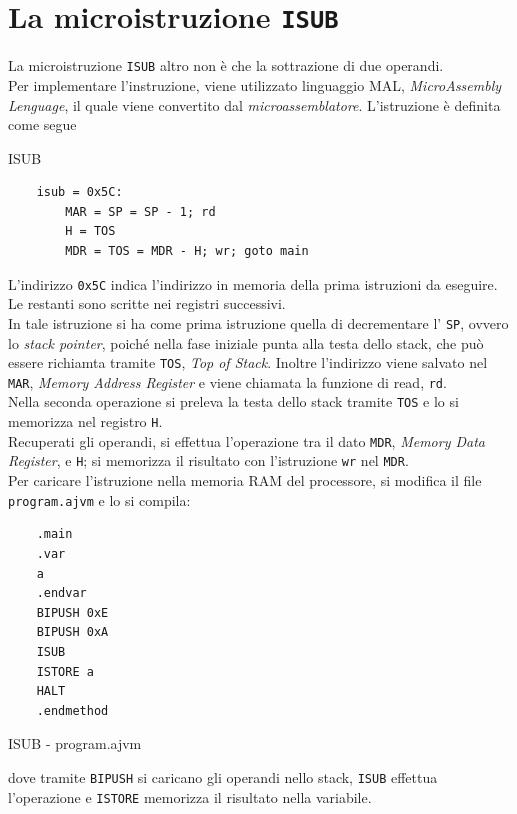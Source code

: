 \section{La microistruzione \texttt{ISUB}}
La microistruzione \texttt{ISUB} altro non è che la sottrazione di due operandi.\\
Per implementare l'instruzione, viene utilizzato linguaggio MAL, \textit{MicroAssembly Lenguage}, il quale viene convertito dal \textit{microassemblatore}.
L'istruzione è definita come segue
\begin{listing}[h]
    \caption{ISUB}
    \begin{verbatim}
    isub = 0x5C:
        MAR = SP = SP - 1; rd
        H = TOS
        MDR = TOS = MDR - H; wr; goto main
    \end{verbatim}
\end{listing}
L'indirizzo \texttt{0x5C} indica l'indirizzo in memoria della prima istruzioni da eseguire. Le restanti sono scritte nei registri successivi. \\
In tale istruzione si ha come prima istruzione quella di decrementare l' \texttt{SP}, ovvero lo \textit{stack pointer}, poiché nella fase iniziale punta alla testa dello stack, che può essere richiamta tramite \texttt{TOS}, \textit{Top of Stack}.
Inoltre l'indirizzo viene salvato nel \texttt{MAR}, \textit{Memory Address Register} e viene chiamata la funzione di read, \texttt{rd}.\\
Nella seconda operazione si preleva la testa dello stack tramite \texttt{TOS} e lo si memorizza nel registro \texttt{H}. \\
Recuperati gli operandi, si effettua l'operazione tra il dato \texttt{MDR}, \textit{Memory Data Register}, e \texttt{H}; si memorizza il risultato con l'istruzione \texttt{wr} nel \texttt{MDR}.\\
Per caricare l'istruzione nella memoria RAM del processore, si modifica il file \texttt{program.ajvm} e lo si compila:
\begin{listing}[h]
    \begin{verbatim}
    .main
    .var
    a
    .endvar
    BIPUSH 0xE
    BIPUSH 0xA
    ISUB
    ISTORE a
    HALT
    .endmethod
    \end{verbatim}
    \caption{ISUB - program.ajvm}
\end{listing}
dove tramite \texttt{BIPUSH} si caricano gli operandi nello stack, \texttt{ISUB} effettua l'operazione e \texttt{ISTORE} memorizza il risultato nella variabile.
